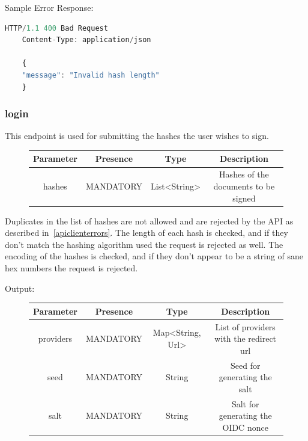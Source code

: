 Sample Error Response:
\begin{lstlisting}[caption={Error response}, captionpos=b, language=JavaScript, label={lst:errorresponse}]
    HTTP/1.1 400 Bad Request
    Content-Type: application/json

    {
    "message": "Invalid hash length"
    }
\end{lstlisting}

\subsubsection{login}
This endpoint is used for submitting the hashes the user wishes to sign.

\begin{figure}[H]
    \begin{center}
        \begin{tabular}{c|c|c|c}
            \textbf{Parameter} & \textbf{Presence} & \textbf{Type} & \textbf{Description} \\
            \hline
            hashes & MANDATORY & List<String> & Hashes of the documents to be signed \\
        \end{tabular}
    \end{center}
\end{figure}

Duplicates in the list of hashes are not allowed and are rejected by the API as described in~\ref{apiclienterrors}.
The length of each hash is checked, and if they don't match the hashing algorithm used the request is rejected as well.
The encoding of the hashes is checked, and if they don't appear to be a string of sane hex numbers the request is rejected.

Output:

\begin{figure}[H]
    \begin{center}
        \begin{tabular}{c|c|c|c}
            \textbf{Parameter} & \textbf{Presence} & \textbf{Type} & \textbf{Description} \\
            \hline
            providers & MANDATORY & Map<String, Url> & List of providers with the redirect url \\
            \hline
            seed & MANDATORY & String & Seed for generating the salt \\
            \hline
            salt & MANDATORY & String & Salt for generating the OIDC nonce \\
        \end{tabular}
    \end{center}
\end{figure}

